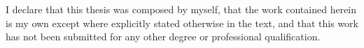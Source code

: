 I declare that this thesis was composed by myself, that the work contained herein is my own except where explicitly stated otherwise in the text, and that this work has not been submitted for any other degree or professional qualification.\\